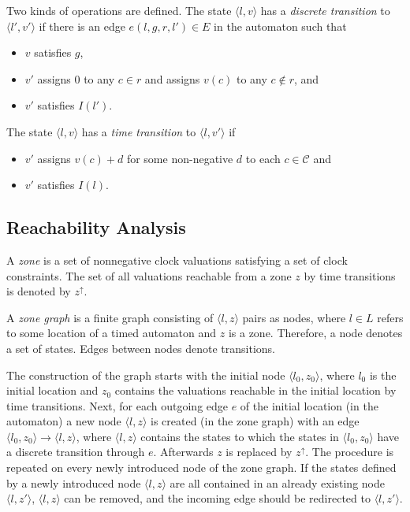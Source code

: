 Two kinds of operations are defined. The state $\langle l,v \rangle$ has a
\emph{discrete transition} to $\langle l',v' \rangle$  if there is an
edge $e(l,g,r,l') \in E$ in the automaton such that 
\begin{itemize}
	\item $v$ satisfies $g$, 
	\item $v'$ assigns 0 to any $c \in r$ and assigns $v(c)$ to any $c \not\in r$, and
	\item $v'$ satisfies $I(l')$. 
\end{itemize}
The state $\langle l,v \rangle$ has a \emph{time transition} to $\langle l,v' \rangle$ if
\begin{itemize}
	\item $v'$ assigns $v(c)+d$ for some non-negative $d$ to each $c \in \mathcal{C}$ and
	\item $v'$ satisfies $I(l)$. 
\end{itemize}




\subsection{Reachability Analysis} \label{sec:reach}  

A \emph{zone} is a set of nonnegative clock valuations satisfying a set of clock constraints.
The set of all valuations reachable from a zone $z$ by time transitions is denoted by $z^\uparrow$.

A \emph{zone graph} is a finite graph consisting of $\langle l,z \rangle$ pairs as nodes, where $l \in L$ refers to some
location of a timed automaton and $z$ is a zone. Therefore, a node denotes a set
of states. Edges between nodes denote transitions. 

The construction of the graph starts with the initial node  $\langle l_0,z_0 \rangle$,
where $l_0$ is the initial location and $z_0$ contains the valuations reachable in the initial location by time transitions. 
Next, for each outgoing edge $e$ of the initial location (in the automaton) a new node  $\langle l,z \rangle$ is created (in the zone graph) with an edge
$\langle l_0,z_0 \rangle \to \langle l,z \rangle$, where $\langle l,z \rangle$ contains the states to which the states in $\langle l_0,z_0 \rangle$ have a discrete transition through $e$. Afterwards $z$ is replaced by $z^\uparrow$.  The procedure is repeated on every newly introduced node of the zone graph. If the states defined by a newly introduced node $\langle l,z \rangle$ are all contained in an already existing node $\langle l,z' \rangle$, $\langle l,z \rangle$ can be removed, and the incoming edge should be redirected to $\langle l,z' \rangle$.

